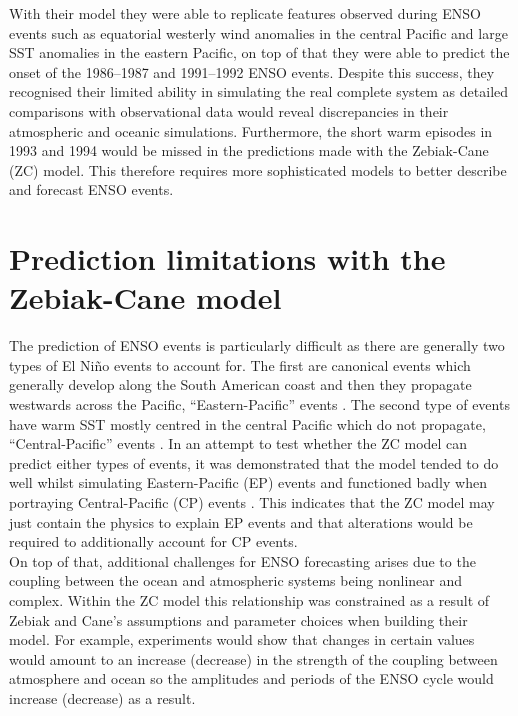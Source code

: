 \documentclass[12pt, onecolumn]{revtex4}    %
\begin{document}
With their model they were able to replicate features observed during ENSO events such as equatorial westerly wind anomalies in the central Pacific and large SST anomalies in the eastern Pacific, on top of that they were able to predict the onset of the 1986--1987 and 1991--1992 ENSO events. Despite this success, they recognised their limited ability in simulating the real complete system as detailed comparisons with observational data would reveal discrepancies in their atmospheric and oceanic simulations. Furthermore, the short warm episodes in 1993 and 1994 would be missed in the predictions made with the Zebiak-Cane (ZC) model. This therefore requires more sophisticated models to better describe and forecast ENSO events.

\section{Prediction limitations with the Zebiak-Cane model}

The prediction of ENSO events is particularly difficult as there are generally two types of El Ni\~{n}o events to account for. The first are canonical events which generally develop along the South American coast and then they propagate westwards across the Pacific, ``Eastern-Pacific'' events \citep{rasmusson1982variations}. The second type of events have warm SST mostly centred in the central Pacific which do not propagate, ``Central-Pacific'' events \citep{ashok2007nino}. In an attempt to test whether the ZC model can predict either types of events, it was demonstrated that the model tended to do well whilst simulating Eastern-Pacific (EP) events and functioned badly when portraying Central-Pacific (CP) events \citep{duan2013behaviors}. This indicates that the ZC model may just contain the physics to explain EP events and that alterations would be required to additionally account for CP events. \\

On top of that, additional challenges for ENSO forecasting arises due to the coupling between the ocean and atmospheric systems being nonlinear and complex. Within the ZC model this relationship was constrained as a result of Zebiak and Cane's assumptions and parameter choices when building their model. For example, experiments would show that changes in certain values would amount to an increase (decrease) in the strength of the coupling between atmosphere and ocean so the amplitudes and periods of the ENSO cycle would increase (decrease) as a result. \\
\end{document}
